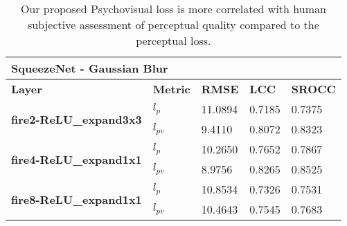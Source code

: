 \documentclass[10pt,twocolumn,letterpaper]{article}
\begin{document}
\begin{table*}[]
\centering
\caption{Our proposed Psychovisual loss is more correlated with human subjective assessment of perceptual quality compared to the perceptual loss.}
\begin{tabular}{|l|l|l|l|l|}
\hline
\multicolumn{5}{|l|}{\textbf{SqueezeNet - Gaussian Blur}}                                                         \\ \hline
\textbf{Layer}                                  & \textbf{Metric} & \textbf{RMSE} & \textbf{LCC} & \textbf{SROCC} \\ \hline
\multirow{2}{*}{\textbf{fire2-ReLU\_expand3x3}} & \textbf{$l_{p}$}              & 11.0894       & 0.7185       & 0.7375         \\ \cline{2-5}
                                                & \textbf{$l_{pv}$}             & 9.4110        & 0.8072       & 0.8323         \\ \hline
\multirow{2}{*}{\textbf{fire4-ReLU\_expand1x1}} & \textbf{$l_{p}$}              & 10.2650       & 0.7652       & 0.7867         \\ \cline{2-5}
                                                & \textbf{$l_{pv}$}             & 8.9756        & 0.8265       & 0.8525         \\ \hline
\multirow{2}{*}{\textbf{fire8-ReLU\_expand1x1}} & \textbf{$l_{p}$}              & 10.8534       & 0.7326       & 0.7531         \\ \cline{2-5}
                                                & \textbf{$l_{pv}$}             & 10.4643       & 0.7545       & 0.7683         \\ \hline
\end{tabular}
\end{table*}
\end{document}
